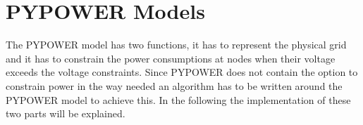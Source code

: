\documentclass[a4paper]{article}
\begin{document}

\newpage

\appendix

\section{PYPOWER Models}
The PYPOWER model has two functions, it has to represent the physical grid and it has to constrain the power consumptions at 
nodes when their voltage exceeds the voltage constraints. Since PYPOWER does not contain the option to constrain power in the way
needed an algorithm has to be written around the PYPOWER model to achieve this. In the following the implementation of these two parts
will be explained.\\
\end{document}
